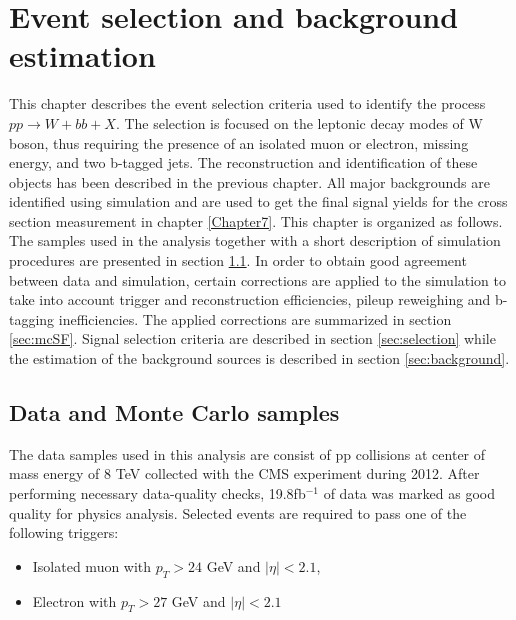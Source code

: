 
\chapter{Event selection and background estimation} %

\label{Chapter6} %


This chapter describes the event selection criteria used to identify the process $pp\rightarrow W+bb+X$. The selection is focused on the leptonic decay modes of W boson, thus requiring the presence of an isolated muon or electron, missing energy, and two b-tagged jets. The reconstruction and identification of these objects has been described in the previous chapter. All major backgrounds are identified using simulation and are used to get the final signal yields for the cross section measurement in chapter \ref{Chapter7}. 
This chapter is organized as follows. The samples used in the analysis together with a short description of simulation procedures are presented in section \ref{sec:samples}. In order to obtain good agreement between data and simulation, certain corrections are applied to the simulation to take into account trigger and reconstruction efficiencies, pileup reweighing and b-tagging inefficiencies. The applied corrections are summarized in section \ref{sec:mcSF}. Signal selection criteria are described in section \ref{sec:selection} while the estimation of the background sources is described in section \ref{sec:background}.     

\section{Data and Monte Carlo samples}
\label{sec:samples}
The data samples used in this analysis are consist of pp collisions at center of mass energy of 8 TeV collected with the CMS experiment during 2012. After performing necessary data-quality checks, 19.8fb$^{-1}$ of data was marked as good quality for physics analysis. Selected events are required to pass one of the following triggers:
\begin{itemize}
\item Isolated muon with $p_T>24$ GeV and $|\eta|<2.1$,
\item Electron with $p_T>27$ GeV and $|\eta|<2.1$
\end{itemize}

